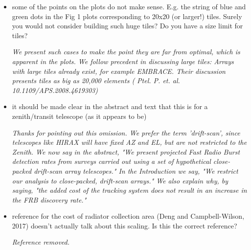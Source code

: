 \documentclass{article}
\begin{document}
\begin{itemize}
{\it Since this ratio is redundant with the cost equation we present, we removed it in the interest of brevity.  The reviewer mis-read the expression. 1:0.92 is the ratio of the dish cost to signal processing cost.  Apparently, the presentation was confusing...but now it's gone. }
    
    \item some of the points on the plots do not make sense. E.g. the string of blue and green dots in the Fig 1 plots corresponding to 20x20 (or larger!) tiles. Surely you would not consider building such huge tiles? Do you have a size limit for tiles? 
    
{\it We present such cases to make the point they are far from optimal, which is apparent in the plots. We follow precedent in discussing large tiles: Arrays with large tiles already exist, for example EMBRACE. Their discussion presents tiles as big as 20,000 elements ( Ptel. P. et. al.  10.1109/APS.2008.4619303) }
    
 
    
    \item it should be made clear in the abstract and text that this is for a zenith/transit telescope (as it appears to be) 
    
{\it Thanks for pointing out this omission. We prefer the term 'drift-scan', since telescopes like HIRAX will have fixed AZ and EL, but are not restricted to the Zenith. We now say in the abstract, "We present projected Fast Radio Burst detection rates from surveys carried out using a set of hypothetical close-packed drift-scan array telescopes." In the Introduction we say, "We restrict our analysis to close-packed, drift-scan arrays." We also explain why, by saying, "the added cost of the tracking system does not result in an increase in the FRB discovery rate."}
    
    \item reference for the cost of radiator collection area (Deng and Campbell-Wilson, 2017) doesn't actually talk about this scaling. Is this the correct reference? 

{\it Reference removed.}    


\end{itemize}
\end{document}
